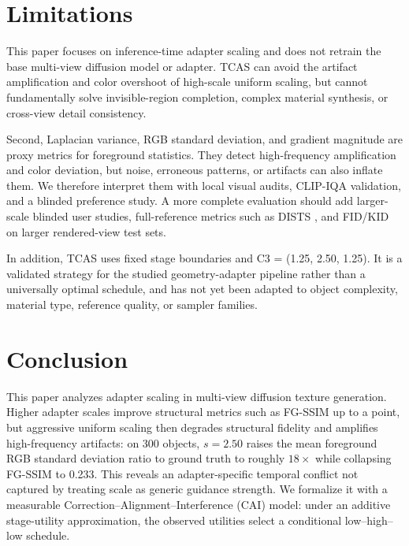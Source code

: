\documentclass[times,twocolumn,final]{elsarticle}
\begin{document}
\FloatBarrier

\section{Limitations}
\label{sec:limitations}

This paper focuses on inference-time adapter scaling and does not retrain the base multi-view diffusion model or adapter. TCAS can avoid the artifact amplification and color overshoot of high-scale uniform scaling, but cannot fundamentally solve invisible-region completion, complex material synthesis, or cross-view detail consistency.

Second, Laplacian variance, RGB standard deviation, and gradient magnitude are proxy metrics for foreground statistics. They detect high-frequency amplification and color deviation, but noise, erroneous patterns, or artifacts can also inflate them. We therefore interpret them with local visual audits, CLIP-IQA validation, and a blinded preference study. A more complete evaluation should add larger-scale blinded user studies, full-reference metrics such as DISTS \cite{ding2022dists}, and FID/KID on larger rendered-view test sets.

In addition, TCAS uses fixed stage boundaries and C3 = (1.25, 2.50, 1.25). It is a validated strategy for the studied geometry-adapter pipeline rather than a universally optimal schedule, and has not yet been adapted to object complexity, material type, reference quality, or sampler families.


\section{Conclusion}
\label{sec:conclusion}

This paper analyzes adapter scaling in multi-view diffusion texture generation. Higher adapter scales improve structural metrics such as FG-SSIM up to a point, but aggressive uniform scaling then degrades structural fidelity and amplifies high-frequency artifacts: on 300 objects, $s = 2.50$ raises the mean foreground RGB standard deviation ratio to ground truth to roughly $18\times$ while collapsing FG-SSIM to 0.233. This reveals an adapter-specific temporal conflict not captured by treating scale as generic guidance strength. We formalize it with a measurable Correction--Alignment--Interference (CAI) model: under an additive stage-utility approximation, the observed utilities select a conditional low--high--low schedule.
\end{document}
